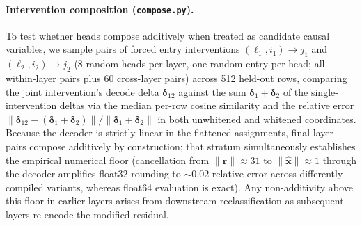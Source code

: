 \paragraph{Intervention composition (\texttt{compose.py}).}
To test whether heads compose additively when treated as candidate causal
variables, we sample pairs of forced entry interventions
$(\ell_1,i_1){\to}j_1$ and $(\ell_2,i_2){\to}j_2$ (8 random heads per
layer, one random entry per head; all within-layer pairs plus 60
cross-layer pairs) across 512 held-out rows, comparing the joint
intervention's decode delta $\boldsymbol{\delta}_{12}$ against the sum
$\boldsymbol{\delta}_1{+}\boldsymbol{\delta}_2$ of the single-intervention
deltas via the median per-row cosine similarity and the relative error
$\lVert\boldsymbol{\delta}_{12}-(\boldsymbol{\delta}_1{+}\boldsymbol{\delta}_2)\rVert
/\lVert\boldsymbol{\delta}_1{+}\boldsymbol{\delta}_2\rVert$ in both
unwhitened and whitened coordinates. Because the decoder is strictly linear
in the flattened assignments, final-layer pairs compose additively by
construction; that stratum simultaneously establishes the empirical
numerical floor (cancellation from $\lVert\mathbf{r}\rVert{\approx}31$ to
$\lVert\hat{\mathbf{x}}\rVert{\approx}1$ through the decoder amplifies
float32 rounding to ${\sim}0.02$ relative error across differently compiled
variants, whereas float64 evaluation is exact). Any non-additivity above
this floor in earlier layers arises from downstream reclassification as
subsequent layers re-encode the modified residual.

